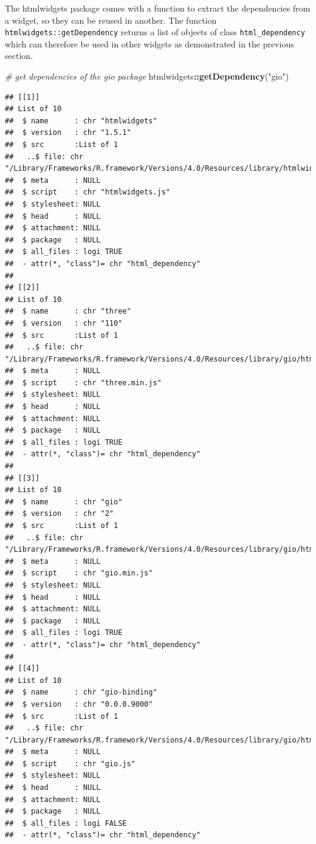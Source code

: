 \documentclass[
]{krantz}
\makeatletter
\newenvironment{Shaded}{\begin{snugshade}}{\end{snugshade}}
\newcommand{\CommentTok}[1]{\textcolor[rgb]{0.37,0.37,0.37}{\textit{#1}}}
\newcommand{\KeywordTok}[1]{\textcolor[rgb]{0.27,0.27,0.27}{\textbf{#1}}}
\newcommand{\NormalTok}[1]{#1}
\newcommand{\OperatorTok}[1]{\textcolor[rgb]{0.43,0.43,0.43}{\textbf{#1}}}
\newcommand{\StringTok}[1]{\textcolor[rgb]{0.5,0.5,0.5}{#1}}
\newenvironment{kframe}{%
\medskip{}
\setlength{\fboxsep}{.8em}
 \def\at@end@of@kframe{}%
 \ifinner\ifhmode%
  \def\at@end@of@kframe{\end{minipage}}%
  \begin{minipage}{\columnwidth}%
 \fi\fi%
 \def\FrameCommand##1{\hskip\@totalleftmargin \hskip-\fboxsep
 \colorbox{shadecolor}{##1}\hskip-\fboxsep
     \hskip-\linewidth \hskip-\@totalleftmargin \hskip\columnwidth}%
 \MakeFramed {\advance\hsize-\width
   \@totalleftmargin\z@ \linewidth\hsize
   \@setminipage}}%
 {\par\unskip\endMakeFramed%
 \at@end@of@kframe}
\renewenvironment{Shaded}{\begin{kframe}}{\end{kframe}}
\makeatother
\begin{document}
The htmlwidgets package comes with a function to extract the dependencies from a widget, so they can be reused in another. The function \texttt{htmlwidgets::getDependency} returns a list of objects of class \texttt{html\_dependency} which can therefore be used in other widgets as demonstrated in the previous section.

\begin{Shaded}
\begin{Highlighting}[]
\CommentTok{\# get dependencies of the gio package}
\NormalTok{htmlwidgets}\OperatorTok{::}\KeywordTok{getDependency}\NormalTok{(}\StringTok{"gio"}\NormalTok{)}
\end{Highlighting}
\end{Shaded}

\begin{verbatim}
## [[1]]
## List of 10
##  $ name      : chr "htmlwidgets"
##  $ version   : chr "1.5.1"
##  $ src       :List of 1
##   ..$ file: chr "/Library/Frameworks/R.framework/Versions/4.0/Resources/library/htmlwidgets/www"
##  $ meta      : NULL
##  $ script    : chr "htmlwidgets.js"
##  $ stylesheet: NULL
##  $ head      : NULL
##  $ attachment: NULL
##  $ package   : NULL
##  $ all_files : logi TRUE
##  - attr(*, "class")= chr "html_dependency"
## 
## [[2]]
## List of 10
##  $ name      : chr "three"
##  $ version   : chr "110"
##  $ src       :List of 1
##   ..$ file: chr "/Library/Frameworks/R.framework/Versions/4.0/Resources/library/gio/htmlwidgets/three"
##  $ meta      : NULL
##  $ script    : chr "three.min.js"
##  $ stylesheet: NULL
##  $ head      : NULL
##  $ attachment: NULL
##  $ package   : NULL
##  $ all_files : logi TRUE
##  - attr(*, "class")= chr "html_dependency"
## 
## [[3]]
## List of 10
##  $ name      : chr "gio"
##  $ version   : chr "2"
##  $ src       :List of 1
##   ..$ file: chr "/Library/Frameworks/R.framework/Versions/4.0/Resources/library/gio/htmlwidgets/gio"
##  $ meta      : NULL
##  $ script    : chr "gio.min.js"
##  $ stylesheet: NULL
##  $ head      : NULL
##  $ attachment: NULL
##  $ package   : NULL
##  $ all_files : logi TRUE
##  - attr(*, "class")= chr "html_dependency"
## 
## [[4]]
## List of 10
##  $ name      : chr "gio-binding"
##  $ version   : chr "0.0.0.9000"
##  $ src       :List of 1
##   ..$ file: chr "/Library/Frameworks/R.framework/Versions/4.0/Resources/library/gio/htmlwidgets"
##  $ meta      : NULL
##  $ script    : chr "gio.js"
##  $ stylesheet: NULL
##  $ head      : NULL
##  $ attachment: NULL
##  $ package   : NULL
##  $ all_files : logi FALSE
##  - attr(*, "class")= chr "html_dependency"
\end{verbatim}
\end{document}
